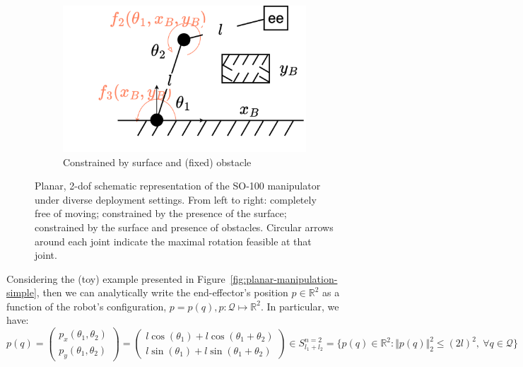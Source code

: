 \begin{figure}
\begin{subfigure}[t]{0.32\linewidth}
    \end{subfigure}\hfill
    \begin{subfigure}[t]{0.32\linewidth}
        \centering
        \includegraphics[width=\linewidth,height=\panelheight,keepaspectratio]{figures/ch2/ch2-planar-manipulator-floor-shelf.png}
        \caption{Constrained by surface and (fixed) obstacle}
        \label{fig:planar-manipulator-floor-shelf}
    \end{subfigure}
    \caption{Planar, 2-dof schematic representation of the SO-100 manipulator under diverse deployment settings. From left to right: completely free of moving; constrained by the presence of the surface; constrained by the surface and presence of obstacles. Circular arrows around each joint indicate the maximal rotation feasible at that joint.}
\end{figure}

Considering the (toy) example presented in Figure~\ref{fig:planar-manipulation-simple}, then we can analytically write the end-effector's position \( p \in \mathbb R^2 \) as a function of the robot's configuration, \( p = p(q), p: \mathcal Q \mapsto \mathbb R^2 \). 
In particular, we have:
\begin{equation*}
p(q) = 
\begin{pmatrix}
p_x(\theta_1, \theta_2) \\  
p_y(\theta_1, \theta_2)
\end{pmatrix}
=
\begin{pmatrix}
l \cos(\theta_1) + l \cos(\theta_1 + \theta_2) \\
l \sin(\theta_1) + l \sin(\theta_1 + \theta_2)
\end{pmatrix}
\in S^{n=2}_{l_1+l_2} = \{ p(q) \in \mathbb R^2: \Vert p(q) \Vert_2^2 \leq (2l)^2, \ \forall q \in \mathcal Q \}
\end{equation*}


